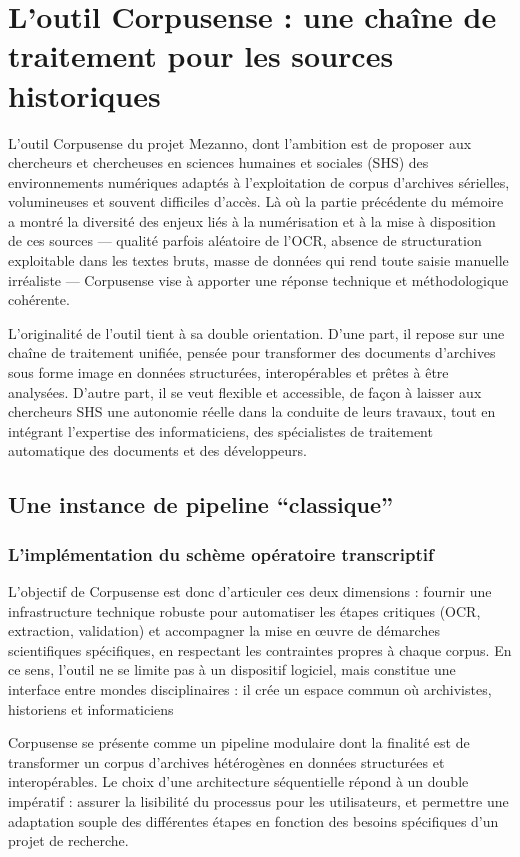 \chapter{L'outil Corpusense : une chaîne de traitement pour les sources historiques}

L’outil Corpusense du projet Mezanno, dont l’ambition est de proposer aux chercheurs et chercheuses en sciences humaines et sociales (SHS) des environnements numériques adaptés à l’exploitation de corpus d’archives sérielles, volumineuses et souvent difficiles d’accès. Là où la partie précédente du mémoire a montré la diversité des enjeux liés à la numérisation et à la mise à disposition de ces sources — qualité parfois aléatoire de l’OCR, absence de structuration exploitable dans les textes bruts, masse de données qui rend toute saisie manuelle irréaliste — Corpusense vise à apporter une réponse technique et méthodologique cohérente.

L’originalité de l’outil tient à sa double orientation. D’une part, il repose sur une chaîne de traitement unifiée, pensée pour transformer des documents d’archives sous forme image en données structurées, interopérables et prêtes à être analysées. D’autre part, il se veut flexible et accessible, de façon à laisser aux chercheurs SHS une autonomie réelle dans la conduite de leurs travaux, tout en intégrant l’expertise des informaticiens, des spécialistes de traitement automatique des documents et des développeurs.

\section{Une instance de pipeline \enquote{classique}}

\subsection{L'implémentation du schème opératoire transcriptif}

L’objectif de Corpusense est donc d’articuler ces deux dimensions : fournir une infrastructure technique robuste pour automatiser les étapes critiques (OCR, extraction, validation) et accompagner la mise en œuvre de démarches scientifiques spécifiques, en respectant les contraintes propres à chaque corpus. En ce sens, l’outil ne se limite pas à un dispositif logiciel, mais constitue une interface entre mondes disciplinaires : il crée un espace commun où archivistes, historiens et informaticiens 

Corpusense se présente comme un pipeline modulaire dont la finalité est de transformer un corpus d’archives hétérogènes en données structurées et interopérables. Le choix d’une architecture séquentielle répond à un double impératif : assurer la lisibilité du processus pour les utilisateurs, et permettre une adaptation souple des différentes étapes en fonction des besoins spécifiques d’un projet de recherche.


